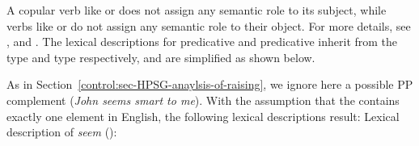 A copular verb like  or  does not assign any semantic role to its subject, while
verbs like  or  do not assign any semantic role to their object. For
more details, see ,
\textcites[Section~2.2.7]{Mueller2002b}[]{MuellerPredication} and .  The lexical descriptions for predicative  and
predicative  inherit from the  type and 
type respectively, and are simplified as shown below. 

As in Section~\ref{control:sec-HPSG-anaylsis-of-raising}, we ignore here a possible PP complement
(\textit{John seems smart to me}). With the assumption that the \subjl contains exactly one
  element in English, the following lexical descriptions result:
\eas
Lexical description of \emph{seem} ():\\
\zs

